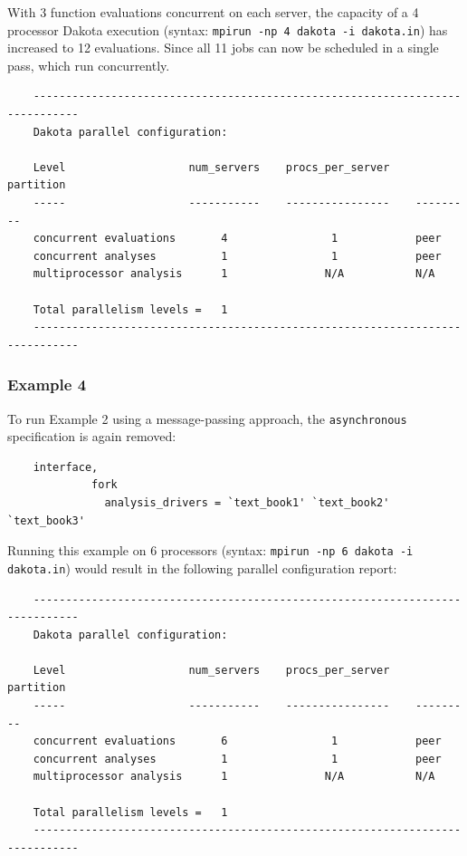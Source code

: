 With 3 function evaluations concurrent on each server, the capacity of
a 4 processor Dakota execution (syntax: \texttt{mpirun -np 4 dakota -i
  dakota.in}) has increased to 12 evaluations. Since all 11 jobs can
now be scheduled in a single pass, which run concurrently.

\begin{small}
\begin{verbatim}
    -----------------------------------------------------------------------------
    Dakota parallel configuration:

    Level                   num_servers    procs_per_server    partition
    -----                   -----------    ----------------    ---------
    concurrent evaluations       4                1            peer
    concurrent analyses          1                1            peer
    multiprocessor analysis      1               N/A           N/A

    Total parallelism levels =   1
    -----------------------------------------------------------------------------
\end{verbatim}
\end{small}

\subsubsection{Example 4}\label{parallel:spec:multi:example4}

To run Example 2 using a message-passing approach, the
\texttt{asynchronous} specification is again removed:
\begin{small}
\begin{verbatim}
    interface,
             fork
               analysis_drivers = `text_book1' `text_book2' `text_book3'
\end{verbatim}
\end{small}

Running this example on 6 processors (syntax: \texttt{mpirun -np 6
  dakota -i dakota.in}) would result in the following parallel
configuration report:
\begin{small}
\begin{verbatim}
    -----------------------------------------------------------------------------
    Dakota parallel configuration:

    Level                   num_servers    procs_per_server    partition
    -----                   -----------    ----------------    ---------
    concurrent evaluations       6                1            peer
    concurrent analyses          1                1            peer
    multiprocessor analysis      1               N/A           N/A

    Total parallelism levels =   1
    -----------------------------------------------------------------------------
\end{verbatim}
\end{small}

